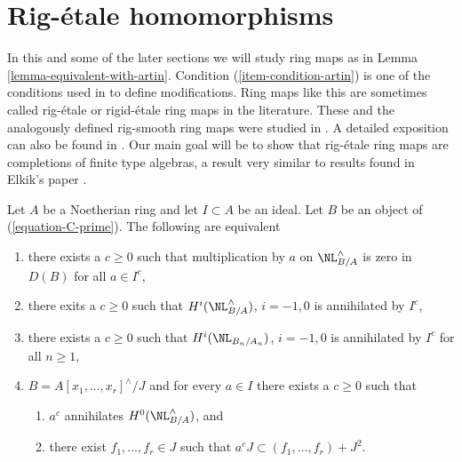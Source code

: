 \section{Rig-\'etale homomorphisms}
\label{section-rig-etale}

\noindent
In this and some of the later sections we will study ring maps as
in Lemma \ref{lemma-equivalent-with-artin}. Condition
(\ref{item-condition-artin}) is one of the conditions used in
\cite{ArtinII} to define modifications. Ring maps like this are sometimes
called rig-\'etale or rigid-\'etale ring maps in the literature. These and
the analogously defined rig-smooth ring maps were studied
in \cite{Elkik}. A detailed exposition can also be found in
\cite{Abbes}. Our main goal will be to show that rig-\'etale
ring maps are completions of finite type algebras, a result
very similar to results found in Elkik's paper \cite{Elkik}.

\begin{lemma}
\label{lemma-equivalent-with-artin}
Let $A$ be a Noetherian ring and let $I \subset A$ be an ideal.
Let $B$ be an object of (\ref{equation-C-prime}). The following are equivalent
\begin{enumerate}
\item
\label{item-zero-on-NL}
there exists a $c \geq 0$ such that multiplication by $a$
on $\NL^\wedge_{B/A}$ is zero in $D(B)$ for all $a \in I^c$,
\item
\label{item-zero-on-cohomology-NL}
there exits a $c \geq 0$ such that $H^i(\NL^\wedge_{B/A})$, $i = -1, 0$ is
annihilated by $I^c$,
\item
\label{item-zero-on-cohomology-NL-truncations}
there exists a $c \geq 0$ such that $H^i(\NL_{B_n/A_n})$, $i = -1, 0$ is
annihilated by $I^c$ for all $n \geq 1$,
\item
\label{item-condition-artin}
$B = A[x_1, \ldots, x_r]^\wedge/J$ and
for every $a \in I$ there exists a $c \geq 0$ such that
\begin{enumerate}
\item $a^c$ annihilates $H^0(\NL^\wedge_{B/A})$, and
\item there exist $f_1, \ldots, f_r \in J$ such that
$a^c J \subset (f_1, \ldots, f_r) + J^2$.
\end{enumerate}
\end{enumerate}
\end{lemma}

